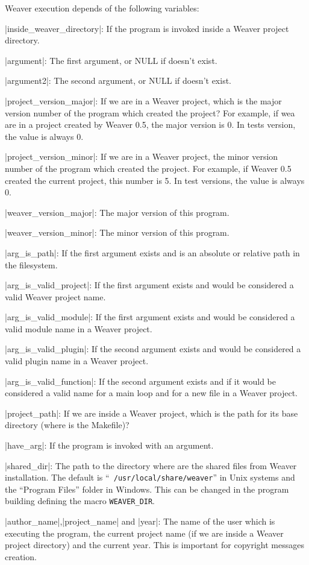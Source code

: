 Weaver execution depends of the following variables:

|inside_weaver_directory|: If the program is invoked inside a Weaver
 project directory.

|argument|: The first argument, or NULL if doesn't exist.

|argument2|: The second argument, or NULL if doesn't exist.

|project_version_major|: If we are in a Weaver project, which is the
 major version number of the program which created the project? For
 example, if wea are in a project created by Weaver 0.5, the major
 version is 0. In tests version, the value is always 0.

|project_version_minor|: If we are in a Weaver project, the minor
 version number of the program which created the project. For example,
 if Weaver 0.5 created the current project, this number is 5. In test
 versions, the value is always 0.

|weaver_version_major|: The major version of this program.

|weaver_version_minor|: The minor version of this program.

|arg_is_path|: If the first argument exists and is an absolute or
 relative path in the filesystem.

|arg_is_valid_project|: If the first argument exists and would be
 considered a valid Weaver project name.

|arg_is_valid_module|: If the first argument exists and would be
 considered a valid module name in a Weaver project.

|arg_is_valid_plugin|: If the second argument exists and would be
 considered a valid plugin name in a Weaver project.

|arg_is_valid_function|: If the second argument exists and if it would
 be considered a valid name for a main loop and for a new file in a
 Weaver project.

|project_path|: If we are inside a Weaver project, which is the path
 for its base directory (where is the Makefile)?

|have_arg|: If the program is invoked with an argument.

|shared_dir|: The path to the directory where are the shared files
 from Weaver installation. The default is ``{\tt
 /usr/local/share/weaver}'' in Unix systems and the ``Program Files''
 folder in Windows. This can be changed in the program building
 defining the macro {\tt WEAVER\_DIR}.

|author_name|,|project_name| and |year|: The name of the user which is
 executing the program, the current project name (if we are inside a
 Weaver project directory) and the current year. This is important for
 copyright messages creation.

